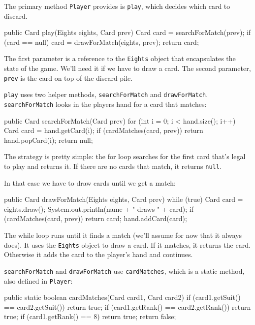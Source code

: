 \documentclass[12pt]{book}
\theoremstyle{exercise}
\newcommand{\java}[1]{\verb"#1"}
\newcommand{\java}[1]{\lstinline{#1}} %
\begin{document}
The primary method \java{Player} provides is \java{play}, which decides which card to discard.

\begin{code}
    public Card play(Eights eights, Card prev) {
        Card card = searchForMatch(prev);
        if (card == null) {
            card = drawForMatch(eights, prev);
        }
        return card;
    }
\end{code}

The first parameter is a reference to the \java{Eights} object that encapsulates the state of the game.
We'll need it if we have to draw a card.
The second parameter, \java{prev} is the card on top of the discard pile.

\java{play} uses two helper methods, \java{searchForMatch} and \java{drawForMatch}.
\java{searchForMatch} looks in the players hand for a card that matches:

\begin{code}
    public Card searchForMatch(Card prev) {
        for (int i = 0; i < hand.size(); i++) {
            Card card = hand.getCard(i);
            if (cardMatches(card, prev)) {
                return hand.popCard(i);
            }
        }
        return null;
    }
\end{code}

The strategy is pretty simple: the for loop searches for the first card that's legal to play and returns it.
If there are no cards that match, it returns \java{null}.

In that case we have to draw cards until we get a match:

\begin{code}
    public Card drawForMatch(Eights eights, Card prev) {
        while (true) {
            Card card = eights.draw();
            System.out.println(name + " draws " + card);
            if (cardMatches(card, prev)) {
                return card;
            }
            hand.addCard(card);
        }
    }
\end{code}

The while loop runs until it finds a match (we'll assume for now that it always does).
It uses the \java{Eights} object to draw a card.
If it matches, it returns the card.
Otherwise it adds the card to the player's hand and continues.

\java{searchForMatch} and \java{drawForMatch} use \java{cardMatches}, which is a static method, also defined in \java{Player}:

\begin{code}
    public static boolean cardMatches(Card card1, Card card2) {
        if (card1.getSuit() == card2.getSuit()) {
            return true;
        }
        if (card1.getRank() == card2.getRank()) {
            return true;
        }
        if (card1.getRank() == 8) {
            return true;
        }
        return false;
    }
\end{code}
\end{document}
